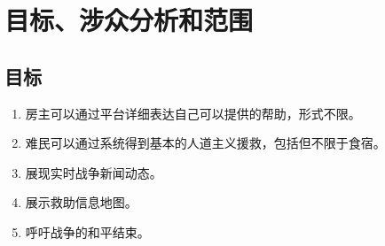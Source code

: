 \chapter{目标、涉众分析和范围}

\section{目标}
\begin{enumerate}
    \item 房主可以通过平台详细表达自己可以提供的帮助，形式不限。
    \item 难民可以通过系统得到基本的人道主义援救，包括但不限于食宿。
    \item 展现实时战争新闻动态。
    \item 展示救助信息地图。
    \item 呼吁战争的和平结束。
\end{enumerate}
